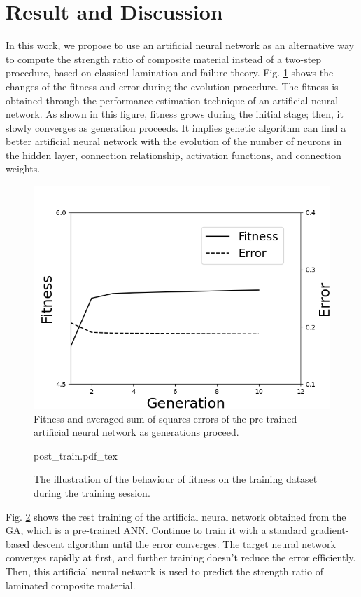 \documentclass[letterpaper]{IEEEtran}
\begin{document}
\section{Result and Discussion}

In this work, we propose to use an artificial neural network as an alternative
way to compute the strength ratio of composite material instead of a two-step
procedure, based on classical lamination and failure theory. Fig.
\ref{fig:ga_nn} shows the changes of the fitness and error during the evolution
procedure. The fitness is obtained through the performance estimation technique
of an artificial neural network. As shown in this figure, fitness grows during
the initial stage; then, it slowly converges as generation proceeds. It implies
genetic algorithm can find a better artificial neural network with the evolution
of the number of neurons in the hidden layer, connection relationship,
activation functions, and connection weights.

\begin{figure}[!tb]
	\includegraphics[width=0.9\linewidth]{result_ga_ann.png}
	\caption{Fitness and averaged sum-of-squares errors of the pre-trained artificial neural network as generations proceed.}
	\label{fig:ga_nn}
\end{figure}

\begin{figure}[!tb]
	\centering
	\def\svgwidth{\columnwidth}
	{post_train.pdf_tex}
	\caption{The illustration of the behaviour of fitness on the training dataset during the training session.}
	\label{fig:final_train}
\end{figure}

Fig. \ref{fig:final_train} shows the rest training of the artificial neural
network obtained from the GA, which is a pre-trained ANN. Continue to train it
with a standard gradient-based descent algorithm until the error converges. The
target neural network converges rapidly at first, and further training doesn’t
reduce the error efficiently. Then, this artificial neural network is used to
predict the strength ratio of laminated composite material.
\end{document}
